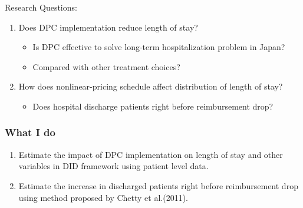 \documentclass[14pt]{beamer}
\begin{document}
\begin{frame}[allowframebreaks]
Research Questions:
\begin{enumerate}
\item Does DPC implementation reduce length of stay? 
\begin{itemize}
\item Is DPC effective to solve long-term hospitalization problem in Japan?
\item Compared with other treatment choices?
\end{itemize}
\vspace{\baselineskip}
\item How does nonlinear-pricing schedule affect distribution of length of stay?
\begin{itemize}
\item Does hospital discharge patients right before reimbursement drop?
\end{itemize}
\end{enumerate}
\end{frame}

\begin{frame}
\frametitle{What I do}
\begin{enumerate}
\item Estimate the impact of DPC implementation on length of stay and other variables in DID framework using patient level data.
\vspace{\baselineskip}
\item Estimate the increase in discharged patients right before reimbursement drop using method proposed by Chetty et al.(2011).
\end{enumerate}
\end{frame}
\end{document}
